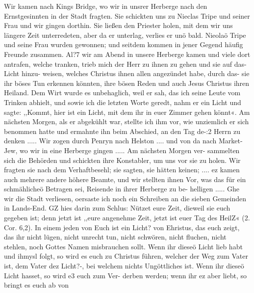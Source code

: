 Wir kamen nach Kings Bridge, wo wir in unsrer Herberge
nach den Ernstgesinnten in der Stadt fragten. Sie schickten uns
zu Nieclas Tripe und seiner Frau und wir 
gingen dorthin. Sie
ließen den Priester holen, mit dem wir uns längere Zeit unterredeten,
aber da er unterlag, verlies er unö bald. Nieolaö Tripe und
seine Frau wurden gewonnen; und seitdem kommen in jener Gegend
häufig Freunde zusammen. Al?7 wir am Abend in unsere
Herberge kamen und viele dort antrafen, welche tranken, trieb
mich der Herr zu ihnen zu gehen und sie auf das- Licht hinzu-
weisen, welches Christus ihnen allen angezündet habe, durch das-
sie ihr böses Tun erkennen könnten, ihre bösen Reden und auch
Jesus Christus ihren Heiland. Dem Wirt wurde es unbehaglich,
weil er sah, das ich seine Leute vom Trinken abhielt, und sowie
ich die letzten Worte geredt, nahm er ein Licht und sagte: ,,Kommt,
hier ist ein Licht, mit dem ihr in euer Zimmer gehen könnt«. Am
nächsten Morgen, als er abgekühlt war, stellte ich ihm vor, wie
unziemlich er sich benommen hatte und ermahnte ihn beim Abschied,
an den Tag de-:2 Herrn zu denken ..... Wir zogen durch
Penryn nach Helston .... und von da nach Market-Jew, wo
wir in eine Herberge gingen ..... Am nächsten Morgen ver-
sammelten sich die Behörden und schickten ihre Konstabler, um
uns vor sie zu holen. Wir fragten sie nach dem Verhaftbesehl;
sie sagten, sie hätten keinen; .... ez kamen auch mehrere
andere höhere Beamte, und wir stellten ihnen Vor, was das für
ein schmählicheö Betragen sei, Reisende in ihrer Herberge zu be-
helligen ..... Ghe wir die Stadt verliesen, oersaste ich noch
ein Schreiben an die sieben Gemeinden in Lands-End. GZ hies
darin zum Schlus: Nützet eure Zeit, dieweil sie euch gegeben
ist; denn jetzt ist ,,eure angenehme Zeit, jetzt ist euer Tag des
HeilZ« (2. Cor. 6,2). In einem jeden von Euch ist ein Licht?
von Ehristus, das euch zeigt, das ihr nicht lügen, nicht unrecht
tun, nicht schwören, nicht fluchen, nicht stehlen, noch Gottes Namen
misbrauchen sollt. Wenn ihr dieseö Licht lieb habt und ihmysl
folgt, so wird es euch zu Christus führen, welcher der Weg zum
Vater ist, dem Vater dez Licht?-, bei welchem nichts Ungöttliches
ist. Wenn ihr dieseö Licht hasset, so wird e3 euch zum Ver-
derben werden; wenn ihr ez aber liebt, so bringt es euch ab von


